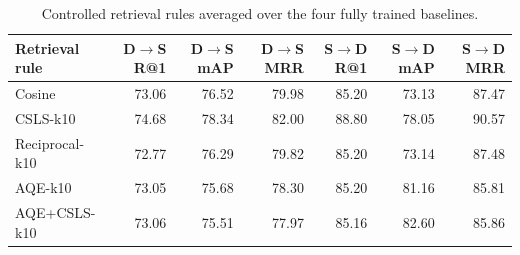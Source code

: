 \begin{table}[!t]
\centering
\small
\caption{Controlled retrieval rules averaged over the four fully trained baselines.}
\label{tab:formal-retrieval-rules}
\begin{tabular}{lrrrrrr}
\toprule
Retrieval rule & D$\rightarrow$S R@1 & D$\rightarrow$S mAP & D$\rightarrow$S MRR & S$\rightarrow$D R@1 & S$\rightarrow$D mAP & S$\rightarrow$D MRR \\
\midrule
Cosine & 73.06 & 76.52 & 79.98 & 85.20 & 73.13 & 87.47 \\
CSLS-k10 & 74.68 & 78.34 & 82.00 & 88.80 & 78.05 & 90.57 \\
Reciprocal-k10 & 72.77 & 76.29 & 79.82 & 85.20 & 73.14 & 87.48 \\
AQE-k10 & 73.05 & 75.68 & 78.30 & 85.20 & 81.16 & 85.81 \\
AQE+CSLS-k10 & 73.06 & 75.51 & 77.97 & 85.16 & 82.60 & 85.86 \\
\bottomrule
\end{tabular}
\end{table}
